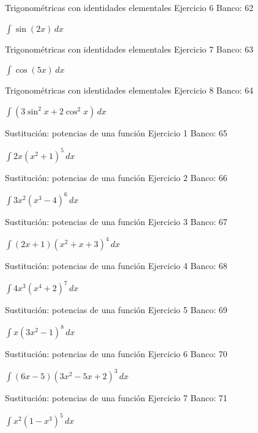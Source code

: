 \documentclass[aspectratio=169,12pt]{beamer}
\newcommand{\ejercicio}[1]{%
  \begin{center}
  \vfill
  {\fontsize{24}{30}\selectfont #1}
  \vfill
  \end{center}
}
\begin{document}
\begin{frame}{Trigonométricas con identidades elementales}
\small Ejercicio 6 \hfill Banco: 62
\ejercicio{$\displaystyle \int\sin(2x)\,dx$}
\end{frame}

\begin{frame}{Trigonométricas con identidades elementales}
\small Ejercicio 7 \hfill Banco: 63
\ejercicio{$\displaystyle \int\cos(5x)\,dx$}
\end{frame}

\begin{frame}{Trigonométricas con identidades elementales}
\small Ejercicio 8 \hfill Banco: 64
\ejercicio{$\displaystyle \int(3\sin^2x+2\cos^2x)\,dx$}
\end{frame}

\begin{frame}{Sustitución: potencias de una función}
\small Ejercicio 1 \hfill Banco: 65
\ejercicio{$\displaystyle \int 2x(x^2+1)^5\,dx$}
\end{frame}

\begin{frame}{Sustitución: potencias de una función}
\small Ejercicio 2 \hfill Banco: 66
\ejercicio{$\displaystyle \int 3x^2(x^3-4)^6\,dx$}
\end{frame}

\begin{frame}{Sustitución: potencias de una función}
\small Ejercicio 3 \hfill Banco: 67
\ejercicio{$\displaystyle \int(2x+1)(x^2+x+3)^4\,dx$}
\end{frame}

\begin{frame}{Sustitución: potencias de una función}
\small Ejercicio 4 \hfill Banco: 68
\ejercicio{$\displaystyle \int 4x^3(x^4+2)^7\,dx$}
\end{frame}

\begin{frame}{Sustitución: potencias de una función}
\small Ejercicio 5 \hfill Banco: 69
\ejercicio{$\displaystyle \int x(3x^2-1)^8\,dx$}
\end{frame}

\begin{frame}{Sustitución: potencias de una función}
\small Ejercicio 6 \hfill Banco: 70
\ejercicio{$\displaystyle \int(6x-5)(3x^2-5x+2)^3\,dx$}
\end{frame}

\begin{frame}{Sustitución: potencias de una función}
\small Ejercicio 7 \hfill Banco: 71
\ejercicio{$\displaystyle \int x^2(1-x^3)^5\,dx$}
\end{frame}
\end{document}
